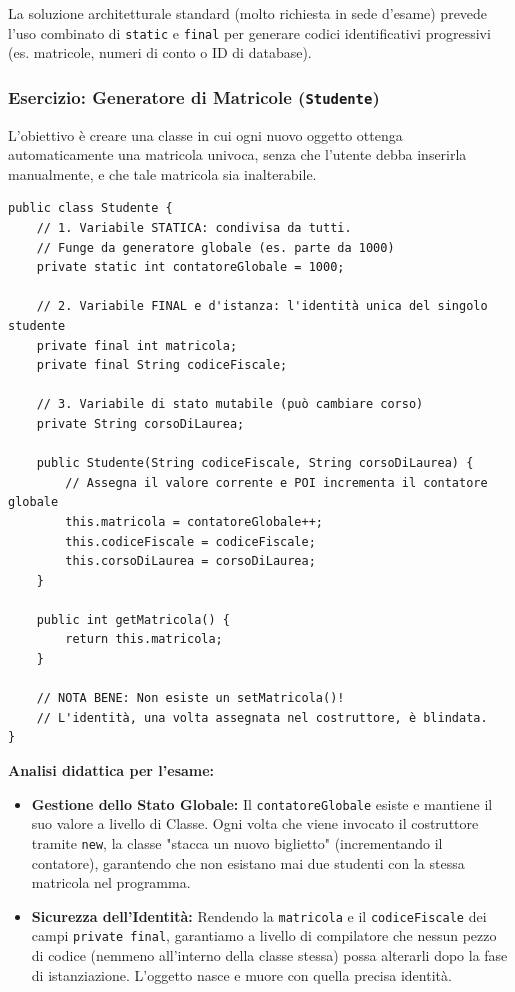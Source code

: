 \documentclass[12pt, a4paper]{article}
\begin{document}
La soluzione architetturale standard (molto richiesta in sede d'esame) prevede l'uso combinato di \texttt{static} e \texttt{final} per generare codici identificativi progressivi (es. matricole, numeri di conto o ID di database).

\subsubsection{Esercizio: Generatore di Matricole (\texttt{Studente})}
L'obiettivo è creare una classe in cui ogni nuovo oggetto ottenga automaticamente una matricola univoca, senza che l'utente debba inserirla manualmente, e che tale matricola sia inalterabile.

\begin{verbatim}
public class Studente {
    // 1. Variabile STATICA: condivisa da tutti.
    // Funge da generatore globale (es. parte da 1000)
    private static int contatoreGlobale = 1000;

    // 2. Variabile FINAL e d'istanza: l'identità unica del singolo studente
    private final int matricola;
    private final String codiceFiscale;
    
    // 3. Variabile di stato mutabile (può cambiare corso)
    private String corsoDiLaurea;

    public Studente(String codiceFiscale, String corsoDiLaurea) {
        // Assegna il valore corrente e POI incrementa il contatore globale
        this.matricola = contatoreGlobale++; 
        this.codiceFiscale = codiceFiscale;
        this.corsoDiLaurea = corsoDiLaurea;
    }

    public int getMatricola() { 
        return this.matricola; 
    }
    
    // NOTA BENE: Non esiste un setMatricola()! 
    // L'identità, una volta assegnata nel costruttore, è blindata.
}
\end{verbatim}

\textbf{Analisi didattica per l'esame:}
\begin{itemize}
    \item \textbf{Gestione dello Stato Globale:} Il \texttt{contatoreGlobale} esiste e mantiene il suo valore a livello di Classe. Ogni volta che viene invocato il costruttore tramite \texttt{new}, la classe "stacca un nuovo biglietto" (incrementando il contatore), garantendo che non esistano mai due studenti con la stessa matricola nel programma.
    \item \textbf{Sicurezza dell'Identità:} Rendendo la \texttt{matricola} e il \texttt{codiceFiscale} dei campi \texttt{private final}, garantiamo a livello di compilatore che nessun pezzo di codice (nemmeno all'interno della classe stessa) possa alterarli dopo la fase di istanziazione. L'oggetto nasce e muore con quella precisa identità.
\end{itemize}
\end{document}
